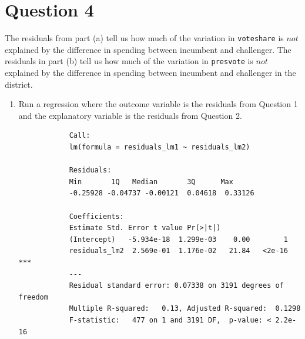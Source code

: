 \documentclass[12pt,letterpaper]{article}
\begin{document}
\newpage	
\section*{Question 4}
\noindent The residuals from part (a) tell us how much of the variation in \texttt{voteshare} is $not$ explained by the difference in spending between incumbent and challenger. The residuals in part (b) tell us how much of the variation in \texttt{presvote} is $not$ explained by the difference in spending between incumbent and challenger in the district.
	\begin{enumerate}
		\item Run a regression where the outcome variable is the residuals from Question 1 and the explanatory variable is the residuals from Question 2.	
		
		\begin{lstlisting}
			Call:
			lm(formula = residuals_lm1 ~ residuals_lm2)
			
			Residuals:
			Min       1Q   Median       3Q      Max 
			-0.25928 -0.04737 -0.00121  0.04618  0.33126 
			
			Coefficients:
			Estimate Std. Error t value Pr(>|t|)    
			(Intercept)   -5.934e-18  1.299e-03    0.00        1    
			residuals_lm2  2.569e-01  1.176e-02   21.84   <2e-16 ***
			---
			Residual standard error: 0.07338 on 3191 degrees of freedom
			Multiple R-squared:   0.13,	Adjusted R-squared:  0.1298 
			F-statistic:   477 on 1 and 3191 DF,  p-value: < 2.2e-16
			

\end{lstlisting}
\end{enumerate}
\end{document}
